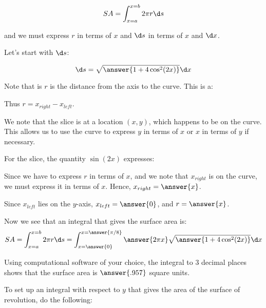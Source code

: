 \documentclass{ximera}
\begin{document}
\begin{exercise}
\[ SA = \int_{x=a}^{x=b} 2 \pi r \d s\]

and we must express $r$ in terms of $x$ and $\d s$ in terms of $x$ and $\d x$.  


Let's start with $\d s$: 

\[
\d s = \sqrt{\answer{1+4\cos^2(2x)}} \d x
\]


\begin{exercise}
Note that is $r$ is the distance from the axis to the curve. This is a:

\begin{multipleChoice}
\end{multipleChoice} 
Thus $r=x_{right}-x_{left}$.  

We note that the slice is at a location $(x,y)$, which happens to be on the curve.  This allows us to use the curve to express $y$ in terms of $x$ or $x$ in terms of $y$ if necessary.  

For the slice, the quantity $\sin(2x)$ expresses:
\begin{multipleChoice}
\end{multipleChoice} 

Since we have to express $r$ in terms of $x$, and we note that $x_{right}$ is on the curve, we must express it in terms of $x$.  Hence, $x_{right} = \answer{x}$.

Since $x_{left}$ lies on the $y$-axis, $x_{left} = \answer{0}$, and $r= \answer{x}$.

\end{exercise}

\begin{exercise}
Now we see that an integral that gives the surface area is: 
\[
SA= \int_{x=a}^{x=b} 2 \pi r \d s = \int_{x=\answer{0}}^{x=\answer{\pi/8}} \answer{2 \pi x} \sqrt{\answer{1+4\cos^2(2x)}} \d x
\]

\begin{exercise}
Using computational software of your choice, the integral to 3 decimal places shows that the surface area is $\answer{.957}$ square units.  
\end{exercise}

\end{exercise}


To set up an integral with respect to $y$ that gives the area of the surface of revolution, do the following:  


\end{exercise}
\end{document}
